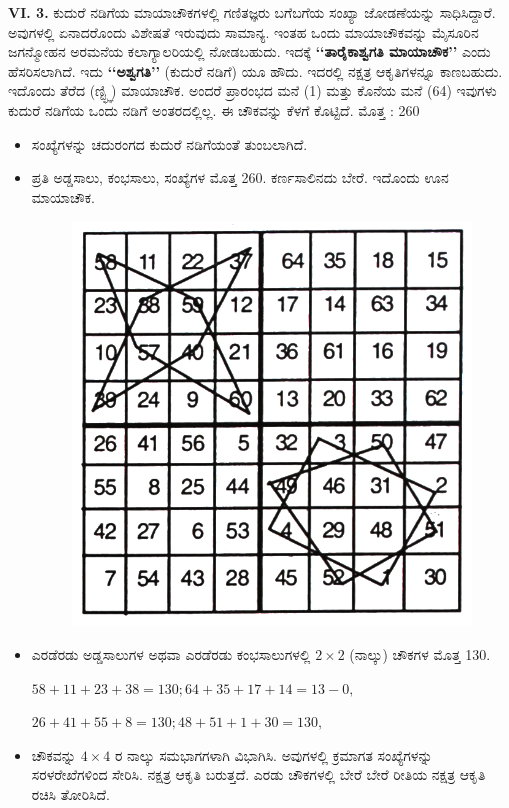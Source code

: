 \textbf{VI. 3.} ಕುದುರೆ ನಡಿಗೆಯ ಮಾಯಾಚೌಕಗಳಲ್ಲಿ ಗಣಿತಜ್ಞರು ಬಗೆಬಗೆಯ ಸಂಖ್ಯಾ ಜೋಡಣೆಯನ್ನು ಸಾಧಿಸಿದ್ದಾರೆ. ಅವುಗಳಲ್ಲಿ ಏನಾದರೊಂದು ವಿಶೇಷತೆ ಇರುವುದು ಸಾಮಾನ್ಯ. ಇಂತಹ ಒಂದು ಮಾಯಾಚೌಕವನ್ನು ಮೈಸೂರಿನ ಜಗನ್ಮೋಹನ ಅರಮನೆಯ ಕಲಾಗ್ಯಾಲರಿಯಲ್ಲಿ ನೋಡಬಹುದು. ಇದಕ್ಕೆ  \textbf{‘‘ತಾರೈಕಾಶ್ವಗತಿ ಮಾಯಾಚೌಕ’’} ಎಂದು ಹೆಸರಿಸಲಾಗಿದೆ. ಇದು \textbf{‘‘ಅಶ್ವಗತಿ’’} (ಕುದುರೆ ನಡಿಗೆ) ಯೂ ಹೌದು. ಇದರಲ್ಲಿ ನಕ್ಷತ್ರ ಆಕೃತಿಗಳನ್ನೂ ಕಾಣಬಹುದು. ಇದೊಂದು ತೆರೆದ (ಣ್ಟ್ಛ್ಞಿ) ಮಾಯಾಚೌಕ. ಅಂದರೆ ಪ್ರಾರಂಭದ ಮನೆ (1) ಮತ್ತು ಕೊನೆಯ ಮನೆ (64) ಇವುಗಳು ಕುದುರೆ ನಡಿಗೆಯ ಒಂದು ನಡಿಗೆ ಅಂತರದಲ್ಲಿಲ್ಲ. ಈ ಚೌಕವನ್ನು ಕೆಳಗೆ ಕೊಟ್ಟಿದೆ. ಮೊತ್ತ : 260
\begin{itemize}
	\item ಸಂಖ್ಯೆಗಳನ್ನು ಚದುರಂಗದ ಕುದುರೆ ನಡಿಗೆಯಂತೆ ತುಂಬಲಾಗಿದೆ.
	\item ಪ್ರತಿ ಅಡ್ಡಸಾಲು, ಕಂಭಸಾಲು, ಸಂಖ್ಯೆಗಳ ಮೊತ್ತ 260. ಕರ್ಣಸಾಲಿನದು ಬೇರೆ. ಇದೊಂದು ಊನ ಮಾಯಾಚೌಕ.
	\begin{figure}[H]
	\includegraphics{src/figures/chap6/fig6.4.jpg}
	\end{figure}
	\item ಎರಡೆರಡು ಅಡ್ಡಸಾಲುಗಳ ಅಥವಾ ಎರಡೆರಡು ಕಂಭಸಾಲುಗಳಲ್ಲಿ $2 \times 2$ (ನಾಲ್ಕು) ಚೌಕಗಳ ಮೊತ್ತ 130.

	$58+11+23+38=130; 64+35+17+14=13-0,$

	$26+41+55+8= 130; 48+51+1+30=130,$
	\item ಚೌಕವನ್ನು $4 \times 4$ ರ ನಾಲ್ಕು ಸಮಭಾಗಗಳಾಗಿ ವಿಭಾಗಿಸಿ. ಅವುಗಳಲ್ಲಿ ಕ್ರಮಾಗತ ಸಂಖ್ಯೆಗಳನ್ನು ಸರಳರೇಖೆಗಳಿಂದ ಸೇರಿಸಿ. ನಕ್ಷತ್ರ ಆಕೃತಿ ಬರುತ್ತದೆ. ಎರಡು ಚೌಕಗಳಲ್ಲಿ ಬೇರೆ ಬೇರೆ ರೀತಿಯ ನಕ್ಷತ್ರ ಆಕೃತಿ ರಚಿಸಿ ತೋರಿಸಿದೆ.
\end{itemize}

